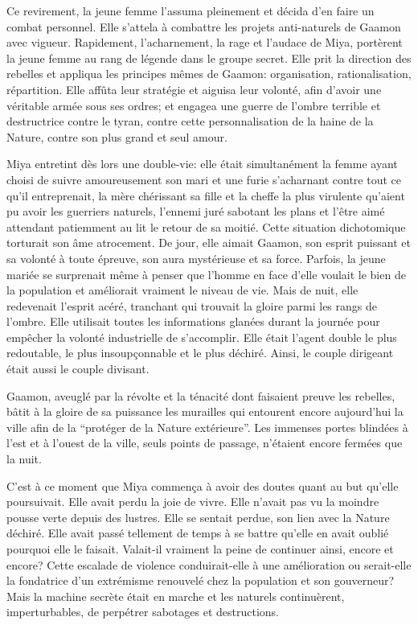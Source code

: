Ce revirement, la jeune femme l'assuma pleinement et décida d'en faire un combat personnel. Elle s'attela à combattre les projets anti-naturels de Gaamon avec vigueur. Rapidement, l'acharnement, la rage et l'audace de Miya, portèrent la jeune femme au rang de légende dans le groupe secret. Elle prit la direction des rebelles et appliqua les principes mêmes de Gaamon: organisation, rationalisation, répartition. Elle affûta leur stratégie et aiguisa leur volonté, afin d'avoir une véritable armée sous ses ordres; et engagea une guerre de l'ombre terrible et destructrice contre le tyran, contre cette personnalisation de la haine de la Nature, contre son plus grand et seul amour.

Miya entretint dès lors une double-vie: elle était simultanément la femme ayant choisi de suivre amoureusement son mari et une furie s'acharnant contre tout ce qu'il entreprenait, la mère chérissant sa fille et la cheffe la plus virulente qu'aient pu avoir les guerriers naturels, l'ennemi juré sabotant les plans et l'être aimé attendant patiemment au lit le retour de sa moitié. Cette situation dichotomique torturait son âme atrocement. De jour, elle aimait Gaamon, son esprit puissant et sa volonté à toute épreuve, son aura mystérieuse et sa force. Parfois, la jeune mariée se surprenait même à penser que l'homme en face d'elle voulait le bien de la population et améliorait vraiment le niveau de vie. Mais de nuit, elle redevenait l'esprit acéré, tranchant qui trouvait la gloire parmi les rangs de l'ombre. Elle utilisait toutes les informations glanées durant la journée pour empêcher la volonté industrielle de s'accomplir. Elle était l'agent double le plus redoutable, le plus insoupçonnable et le plus déchiré. Ainsi, le couple dirigeant était aussi le couple divisant.

Gaamon, aveuglé par la révolte et la ténacité dont faisaient preuve les rebelles, bâtit à la gloire de sa puissance les murailles qui entourent encore aujourd'hui la ville afin de la \enquote{protéger de la Nature extérieure}. Les immenses portes blindées à l'est et à l'ouest de la ville, seuls points de passage, n'étaient encore fermées que la nuit.

C'est à ce moment que Miya commença à avoir des doutes quant au but qu'elle poursuivait. Elle avait perdu la joie de vivre. Elle n'avait pas vu la moindre pousse verte depuis des lustres. Elle se sentait perdue, son lien avec la Nature déchiré. Elle avait passé tellement de temps à se battre qu'elle en avait oublié pourquoi elle le faisait. Valait-il vraiment la peine de continuer ainsi, encore et encore? Cette escalade de violence conduirait-elle à une amélioration ou serait-elle la fondatrice d'un extrémisme renouvelé chez la population et son gouverneur? Mais la machine secrète était en marche et les naturels continuèrent, imperturbables, de perpétrer sabotages et destructions. 

